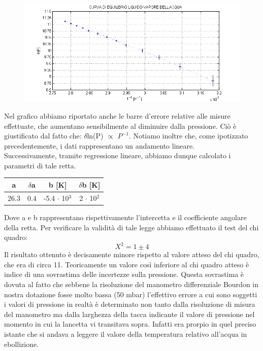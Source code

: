 \documentclass[11pt]{article}
\begin{document}
\begin{figure}[H]
\hspace{-38mm}
\includegraphics[scale=1.10]{pressione_temperatura.png}
\end{figure}

Nel grafico abbiamo riportato anche le barre d'errore relative alle misure effettuate, che aumentano sensibilmente al diminuire dalla pressione. Ciò è giustificato dal fatto che: $\delta$ln(P) $\propto$ $P^{-1}$. Notiamo inoltre che, come ipotizzato precedentemente, i dati rappresentano un andamento lineare.\\
Successivamente, tramite regressione lineare, abbiamo dunque calcolato i parametri di tale retta. 
\begin{center}
\begin{tabular}{|c|c|c|c|}
\hline
a & $\delta$a & b [\unit{K}] & $\delta$b [\unit{K}]\\
\hline
 26.3 & 0.4 & -5.4 $\cdot$ 10$^{3}$ & 2 $\cdot$ 10$^{2}$ \\
\hline
\end{tabular}
\end{center}
Dove a e b rappresentano rispettivamente l'intercetta e il coefficiente angolare della retta. Per verificare la validità di tale legge abbiamo effettuato il test del chi quadro:
\begin{equation}
X^2 = 1 \pm 4
\end{equation}
Il risultato ottenuto è decisamente minore rispetto al valore atteso del chi quadro, che era di circa 11. Teoricamente un valore così inferiore al chi quadro atteso è indice di una sovrastima delle incertezze sulla pressione. Questa sovrastima è dovuta al fatto che sebbene la risoluzione del manometro differenziale Bourdon in  nostra dotazione fosse molto bassa (50 \unit{mbar}) l'effettivo errore a cui sono soggetti i valori di pressione in realtà è determinato non tanto dalla risoluzione di misura del manometro ma dalla larghezza della tacca indicante il valore di pressione nel momento in cui la lancetta vi transitava sopra. Infatti era prorpio in quel preciso istante che si andava a leggere il valore della temperatura relativo all'acqua in ebollizione. %
\end{document}
